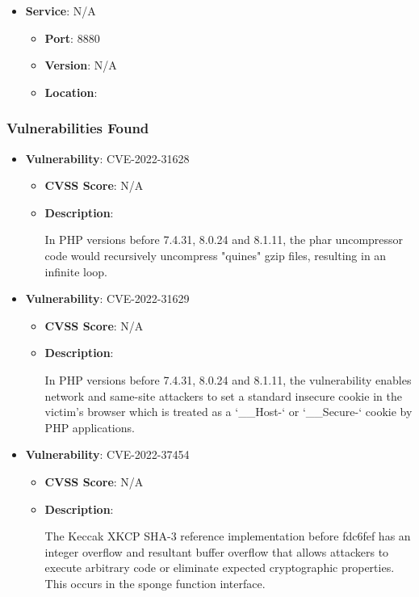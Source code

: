 \documentclass{article}
\begin{document}
\begin{itemize}
        \item \textbf{Service}: N/A
        \begin{itemize}
            \item \textbf{Port}: 8880
            \item \textbf{Version}:  N/A 
            \item \textbf{Location}: \href{  }{  }
        \end{itemize}
    
\end{itemize}


\subsubsection*{Vulnerabilities Found}

\begin{itemize}
    
        \item \textbf{Vulnerability}: CVE-2022-31628
        \begin{itemize}
            \item \textbf{CVSS Score}:  N/A 
            \item \textbf{Description}:
            \parbox[t]{0.9\linewidth}{
                \ttfamily In PHP versions before 7.4.31, 8.0.24 and 8.1.11, the phar uncompressor code would recursively uncompress "quines" gzip files, resulting in an infinite loop.
            }
        \end{itemize}
    
        \item \textbf{Vulnerability}: CVE-2022-31629
        \begin{itemize}
            \item \textbf{CVSS Score}:  N/A 
            \item \textbf{Description}:
            \parbox[t]{0.9\linewidth}{
                \ttfamily In PHP versions before 7.4.31, 8.0.24 and 8.1.11, the vulnerability enables network and same-site attackers to set a standard insecure cookie in the victim's browser which is treated as a `\_\_Host-` or `\_\_Secure-` cookie by PHP applications.
            }
        \end{itemize}
    
        \item \textbf{Vulnerability}: CVE-2022-37454
        \begin{itemize}
            \item \textbf{CVSS Score}:  N/A 
            \item \textbf{Description}:
            \parbox[t]{0.9\linewidth}{
                \ttfamily The Keccak XKCP SHA-3 reference implementation before fdc6fef has an integer overflow and resultant buffer overflow that allows attackers to execute arbitrary code or eliminate expected cryptographic properties. This occurs in the sponge function interface.
            }
        \end{itemize}
    

\end{itemize}
\end{document}
